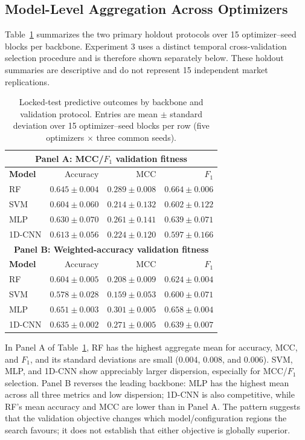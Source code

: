 \subsection{Model-Level Aggregation Across Optimizers}
Table~\ref{tab:predictive_summary} summarizes the two primary holdout protocols over 15 optimizer--seed blocks per backbone. Experiment 3 uses a distinct temporal cross-validation selection procedure and is therefore shown separately below. These holdout summaries are descriptive and do not represent 15 independent market replications.

\begin{table}[!htbp]
\centering
\caption{Locked-test predictive outcomes by backbone and validation protocol. Entries are mean $\pm$ standard deviation over 15 optimizer--seed blocks per row (five optimizers $\times$ three common seeds).}
\label{tab:predictive_summary}
\manuscripttablestyle
\begin{tabular}{lrrr}\toprule
\multicolumn{4}{c}{\textbf{Panel A: MCC/$F_1$ validation fitness}}\\\midrule
\textbf{Model} & Accuracy & MCC & $F_1$\\\midrule
RF & $0.645\pm0.004$ & $0.289\pm0.008$ & $0.664\pm0.006$\\
SVM & $0.604\pm0.060$ & $0.214\pm0.132$ & $0.602\pm0.122$\\
MLP & $0.630\pm0.070$ & $0.261\pm0.141$ & $0.639\pm0.071$\\
1D-CNN & $0.613\pm0.056$ & $0.224\pm0.120$ & $0.597\pm0.166$\\\midrule
\multicolumn{4}{c}{\textbf{Panel B: Weighted-accuracy validation fitness}}\\\midrule
\textbf{Model} & Accuracy & MCC & $F_1$\\\midrule
RF & $0.604\pm0.005$ & $0.208\pm0.009$ & $0.624\pm0.004$\\
SVM & $0.578\pm0.028$ & $0.159\pm0.053$ & $0.600\pm0.071$\\
MLP & $0.651\pm0.003$ & $0.301\pm0.005$ & $0.658\pm0.004$\\
1D-CNN & $0.635\pm0.002$ & $0.271\pm0.005$ & $0.639\pm0.007$\\\bottomrule
\end{tabular}
\end{table}

In Panel A of Table~\ref{tab:predictive_summary}, RF has the highest aggregate mean for accuracy, MCC, and $F_1$, and its standard deviations are small (0.004, 0.008, and 0.006). SVM, MLP, and 1D-CNN show appreciably larger dispersion, especially for MCC/$F_1$ selection. Panel B reverses the leading backbone: MLP has the highest mean across all three metrics and low dispersion; 1D-CNN is also competitive, while RF's mean accuracy and MCC are lower than in Panel A. The pattern suggests that the validation objective changes which model/configuration regions the search favours; it does not establish that either objective is globally superior.




